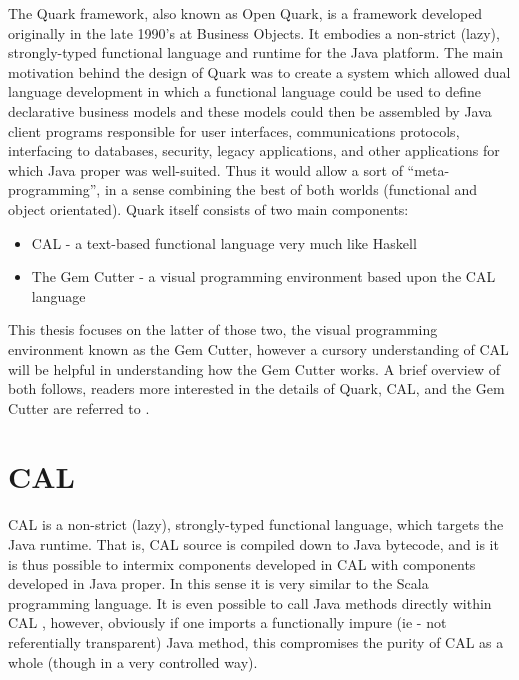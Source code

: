 \label{chapter:quark}

The Quark framework, also known as Open Quark, is a framework developed originally in the late 1990's at Business Objects.
It embodies a non-strict (lazy), strongly-typed functional language and runtime for the Java platform.  The main motivation behind the design of Quark was to create a system which allowed dual language development in which a functional language could be used to define declarative business models and these models could then be assembled by Java client programs responsible for user interfaces, communications protocols, interfacing to databases, security, legacy applications, and other applications for which Java proper was well-suited.  Thus it would allow a sort of ``meta-programming'', in a sense combining the best of both worlds (functional and object orientated).\cite{evans07}  Quark itself consists of two main components:

\begin{itemize}
	\item CAL - a text-based functional language very much like Haskell
	\item The Gem Cutter - a visual programming environment based upon the CAL language
\end{itemize}

This thesis focuses on the latter of those two, the visual programming environment known as the Gem Cutter, however a cursory understanding of CAL will be helpful in understanding how the Gem Cutter works.  A brief overview of both follows, readers more interested in the details of Quark, CAL, and the Gem Cutter are referred to \cite{evans06, evans07}.

\section{CAL}

CAL is a non-strict (lazy), strongly-typed functional language, which targets the Java runtime.  That is, CAL source is compiled down to Java bytecode, and is it is thus possible to intermix components developed in CAL with components developed in Java proper.  In this sense it is very similar to the Scala programming language\cite{scala}.  It is even possible to call Java methods directly within CAL \cite{javaMeetsQuark}, however, obviously if one imports a functionally impure (ie - not referentially transparent) Java method, this compromises the purity of CAL as a whole (though in a very controlled way).  

